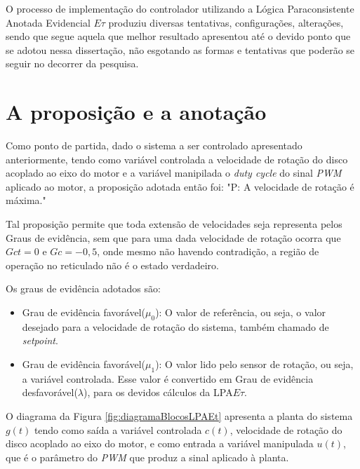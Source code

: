 
O processo de implementação do controlador utilizando a 
Lógica Paraconsistente Anotada Evidencial $E\tau$
produziu diversas tentativas, configurações, alterações, 
sendo que segue aquela que melhor resultado apresentou até
o devido ponto que se adotou nessa dissertação, 
não esgotando as formas e tentativas que poderão se seguir 
no decorrer da pesquisa.


\section{A proposição e a anotação}
Como ponto de partida, 
dado o sistema a ser controlado apresentado anteriormente, 
tendo como variável controlada 
a velocidade de rotação do disco acoplado ao eixo do motor e 
a variável manipilada o \emph{duty cycle} do sinal \emph{PWM} aplicado ao motor,
a proposição adotada então foi: 
"P: A velocidade de rotação é máxima."

Tal proposição permite que toda extensão de velocidades 
seja representa pelos Graus de evidência, 
sem que para uma dada velocidade de rotação ocorra que 
$Gct=0$ e $Gc = -0,5$,
onde mesmo não havendo contradição, 
a região de operação no reticulado não é o estado verdadeiro.

Os graus de evidência adotados são: 

\begin{itemize}
\item Grau de evidência favorável($\mu_0$): 
O valor de referência, ou seja, 
o valor desejado para a velocidade de rotação do sistema,
também chamado de \emph{setpoint}.
\item Grau de evidência favorável($\mu_1$): 
O valor lido pelo sensor de rotação, ou seja, a variável controlada.
Esse valor é convertido em 
Grau de evidência desfavorável($\lambda$),
para os devidos cálculos da LPA$E\tau$.
\end{itemize}

O diagrama da Figura \ref{fig:diagramaBlocosLPAEt} apresenta 
a planta do sistema $g(t)$ tendo como saída a 
variável controlada $c(t)$, 
velocidade de rotação do disco acoplado ao eixo do motor, 
e como entrada a variável manipulada $u(t)$, 
que é o parâmetro do \emph{PWM} 
que produz a sinal aplicado à planta.


